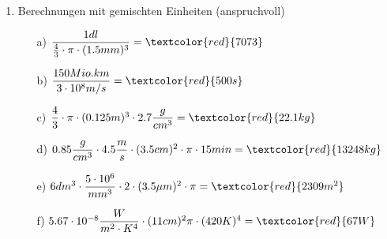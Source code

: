 \documentclass[11pt, a4paper, twoside, fleqn]{article}
\begin{document}
\begin{enumerate}[itemsep=1ex, leftmargin=*]
\item Berechnungen mit gemischten Einheiten (anspruchvoll)
    \begin{enumerate}[itemsep=2mm]
        \item[a)] $ \dfrac{1dl}{\frac{4}{3} \cdot \pi \cdot (1.5 mm)^{3}} = \textcolor{red}{7073} $
        \item[b)] $ \dfrac{150 Mio. km}{3 \cdot 10^{8} m/s} = \textcolor{red}{500 s} $
        \item[c)] $ \dfrac{4}{3} \cdot \pi \cdot (0.125 m)^{3} \cdot 2.7 \dfrac{g}{cm^{3}} = \textcolor{red}{22.1 kg} $
        \item[d)] $ 0.85 \dfrac{g}{cm^{3}} \cdot 4.5 \dfrac{m}{s} \cdot (3.5 cm)^{2} \cdot \pi \cdot 15 min = \textcolor{red}{13248kg} $
        \item[e)] $ 6 dm^{3} \cdot \dfrac{5 \cdot 10^{6}}{mm^{3}} \cdot 2 \cdot (3.5 \mu m)^{2} \cdot \pi = \textcolor{red}{2309 m^{2}} $ 
        \item[f)] $ 5.67 \cdot 10^{-8} \dfrac{W}{m^{2} \cdot K^{4}} \cdot (11cm)^{2} \pi \cdot (420 K)^{4} = \textcolor{red}{67 W} $
    \end{enumerate}
\end{enumerate}
\end{document}
